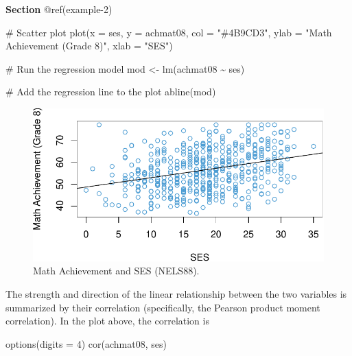 \documentclass[
  letterpaper,
  DIV=11,
  numbers=noendperiod]{scrreprt}
\newenvironment{Shaded}{\begin{snugshade}}{\end{snugshade}}
\newcommand{\AttributeTok}[1]{\textcolor[rgb]{0.40,0.45,0.13}{#1}}
\newcommand{\CommentTok}[1]{\textcolor[rgb]{0.37,0.37,0.37}{#1}}
\newcommand{\DecValTok}[1]{\textcolor[rgb]{0.68,0.00,0.00}{#1}}
\newcommand{\FunctionTok}[1]{\textcolor[rgb]{0.28,0.35,0.67}{#1}}
\newcommand{\NormalTok}[1]{\textcolor[rgb]{0.00,0.23,0.31}{#1}}
\newcommand{\OtherTok}[1]{\textcolor[rgb]{0.00,0.23,0.31}{#1}}
\newcommand{\SpecialCharTok}[1]{\textcolor[rgb]{0.37,0.37,0.37}{#1}}
\newcommand{\StringTok}[1]{\textcolor[rgb]{0.13,0.47,0.30}{#1}}
\begin{document}
\textbf{Section} @ref(example-2)

\begin{Shaded}
\begin{Highlighting}[]
\CommentTok{\# Scatter plot}
\FunctionTok{plot}\NormalTok{(}\AttributeTok{x =}\NormalTok{ ses, }\AttributeTok{y =}\NormalTok{ achmat08, }\AttributeTok{col =} \StringTok{"\#4B9CD3"}\NormalTok{, }\AttributeTok{ylab =} \StringTok{"Math Achievement (Grade 8)"}\NormalTok{, }\AttributeTok{xlab =} \StringTok{"SES"}\NormalTok{)}

\CommentTok{\# Run the regression model}
\NormalTok{mod }\OtherTok{\textless{}{-}} \FunctionTok{lm}\NormalTok{(achmat08 }\SpecialCharTok{\textasciitilde{}}\NormalTok{ ses)}

\CommentTok{\# Add the regression line to the plot}
\FunctionTok{abline}\NormalTok{(mod) }
\end{Highlighting}
\end{Shaded}

\begin{figure}[H]

{\centering \includegraphics{ch2_simple_regression_files/figure-pdf/unnamed-chunk-8-1.pdf}

}

\caption{Math Achievement and SES (NELS88).}

\end{figure}

The strength and direction of the linear relationship between the two
variables is summarized by their correlation (specifically, the Pearson
product moment correlation). In the plot above, the correlation is

\begin{Shaded}
\begin{Highlighting}[]
\FunctionTok{options}\NormalTok{(}\AttributeTok{digits =} \DecValTok{4}\NormalTok{)}
\FunctionTok{cor}\NormalTok{(achmat08, ses)}
\end{Highlighting}
\end{Shaded}
\end{document}
